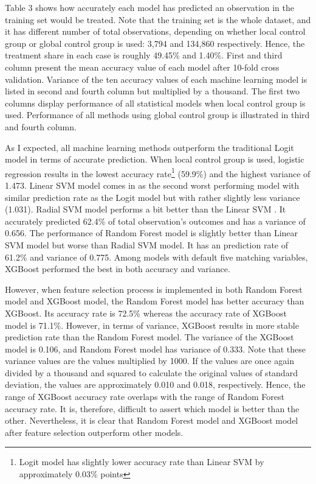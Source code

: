 \documentclass[11pt,a4paper,oneside]{article}
\begin{document}
\par
Table 3 shows how accurately each model has predicted an observation in the training set would be treated. Note that the training set is the whole dataset, and it has different number of total observations, depending on whether local control group or global control group is used: 3,794 and 134,860 respectively. Hence, the treatment share in each case is roughly 49.45\% and 1.40\%. First and third column present the mean accuracy value of each model after 10-fold cross validation. Variance of the ten accuracy values of each machine learning model is listed in second and fourth column but multiplied by a thousand. The first two columns display performance of all statistical models when local control group is used. Performance of all methods using global control group is illustrated in third and fourth column.
\par
As I expected, all machine learning methods outperform the traditional Logit model in terms of accurate prediction. When local control group is used, logistic regression results in the lowest accuracy rate\footnote{Logit model has slightly lower accuracy rate than Linear SVM by approximately 0.03\% points} (59.9\%) and the highest variance of 1.473. Linear SVM model comes in as the second worst performing model with similar prediction rate as the Logit model but with rather slightly less variance (1.031). Radial SVM model performs a bit better than the Linear SVM . It accurately predicted 62.4\% of total observation's outcomes and has a variance of 0.656. The performance of Random Forest model is slightly better than Linear SVM model but worse than Radial SVM model. It has an prediction rate of 61.2\% and variance of 0.775. Among models with default five matching variables, XGBoost performed the best in both accuracy and variance. 

\par 
However, when feature selection process is implemented in both Random Forest model and XGBoost model, the Random Forest model has better accuracy than XGBoost. Its accuracy rate is 72.5\% whereas the accuracy rate of XGBoost model is 71.1\%. However, in terms of variance, XGBoost results in more stable prediction rate than the Random Forest model. The variance of the XGBoost model is 0.106, and Random Forest model has variance of 0.333. Note that these variance values are the values multiplied by 1000. If the values are once again divided by a thousand and squared to calculate the original values of standard deviation, the values are approximately 0.010 and 0.018, respectively. Hence, the range of XGBoost accuracy rate overlaps with the range of Random Forest accuracy rate. It is, therefore, difficult to assert which model is better than the other. Nevertheless, it is clear that Random Forest model and XGBoost model after feature selection outperform other models.
\end{document}
